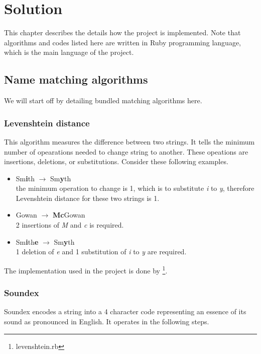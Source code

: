 \chapter{Solution}
\label{ch:solution}

This chapter describes the details how the project is implemented.
Note that algorithms and codes listed here are written in Ruby programming language,
which is the main language of the project.

\section{Name matching algorithms}

We will start off by detailing bundled matching algorithms here.

\subsection{Levenshtein distance}

This algorithm measures the difference between two strings.
It tells the minimum number of opearations needed to change string to
another. These opeations are insertions, deletions, or substitutions.
Consider these following examples.

\begin{itemize}
  \item Sm\textbf{i}th $\rightarrow$ Sm\textbf{y}th \\
    the minimum operation to change is 1, which is to substitute \emph{i} to
    \emph{y}, therefore Levenshtein distance for these two strings is 1.
  \item Gowan $\rightarrow$ \textbf{Mc}Gowan \\
    2 insertions of \emph{M} and \emph{c} is required.
  \item Sm\textbf{i}th\textbf{e} $\rightarrow$ Sm\textbf{y}th \\
    1 deletion of \emph{e} and 1 substitution of \emph{i} to \emph{y} are required.
\end{itemize}

The implementation used in the project is done by \citet{textgem}\footnote{levenshtein.rb}.

\subsection{Soundex}
\label{sub:soundex}

Soundex encodes a string into a 4 character code representing
an essence of its sound as pronounced in English. It operates
in the following steps.

